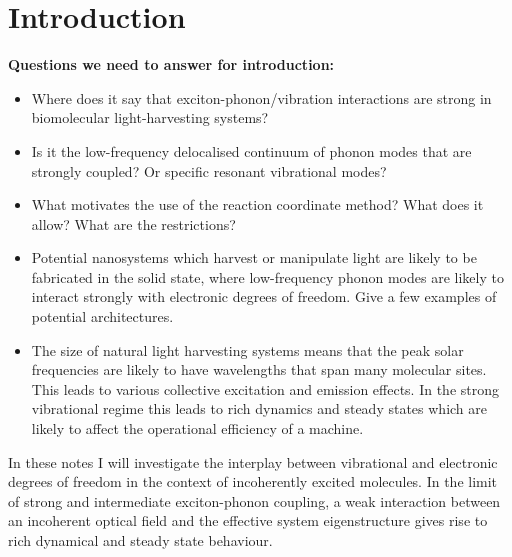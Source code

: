 \documentclass[]{article}
\begin{document}
\section{Introduction}
\textbf{Questions we need to answer for introduction:}
\begin{itemize}
	\item Where does it say that exciton-phonon/vibration interactions are strong in biomolecular light-harvesting systems?
	\item Is it the low-frequency delocalised continuum of phonon modes that are strongly coupled? Or specific resonant vibrational modes?
	\item What motivates the use of the reaction coordinate method? What does it allow? What are the restrictions?
	\item Potential nanosystems which harvest or manipulate light are likely to be fabricated in the solid state, where low-frequency phonon modes are likely to interact strongly with electronic degrees of freedom. Give a few examples of potential architectures.
	\item The size of natural light harvesting systems means that the peak solar frequencies are likely to have wavelengths that span many molecular sites. This leads to various collective excitation and emission effects. In the strong vibrational regime this leads to rich dynamics and steady states which are likely to affect the operational efficiency of a machine.
\end{itemize}
In these notes I will investigate the interplay between vibrational and electronic degrees of freedom in the context of incoherently excited molecules. In the limit of strong and intermediate exciton-phonon coupling, a weak interaction between an incoherent optical field and the effective system eigenstructure gives rise to rich dynamical and steady state behaviour. 
\end{document}
